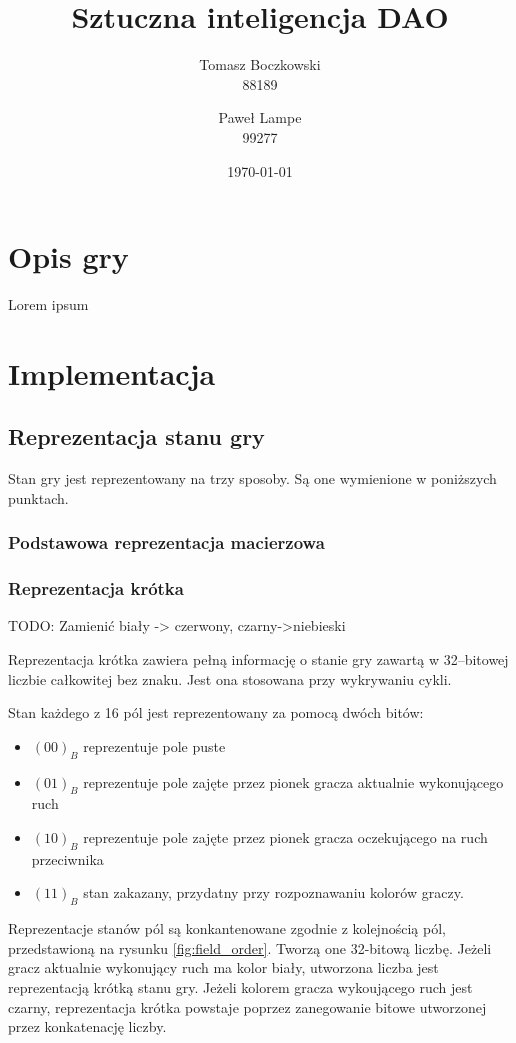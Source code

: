 \documentclass{scrartcl}
\title{Sztuczna inteligencja DAO}
\date{\today}
\author{Tomasz Boczkowski\\ 88189 \and Paweł Lampe\\ 99277}
\begin{document}


\section{Opis gry}

Lorem ipsum

\section{Implementacja}

\subsection{Reprezentacja stanu gry}

Stan gry jest reprezentowany na trzy sposoby. Są one wymienione w
poniższych punktach.

\subsubsection{Podstawowa reprezentacja macierzowa}

\subsubsection{Reprezentacja krótka}

TODO: Zamienić biały -> czerwony, czarny->niebieski

Reprezentacja krótka zawiera pełną informację o stanie gry zawartą
w 32--bitowej liczbie całkowitej bez znaku. Jest ona stosowana przy
wykrywaniu cykli.

Stan każdego z 16 pól jest reprezentowany za pomocą dwóch
bitów:
\begin{itemize}
\item $(00)_B$ reprezentuje pole puste
\item $(01)_B$ reprezentuje pole zajęte przez pionek gracza aktualnie
  wykonującego ruch
\item $(10)_B$ reprezentuje pole zajęte przez pionek gracza
  oczekującego na ruch przeciwnika
\item $(11)_B$ stan zakazany, przydatny przy rozpoznawaniu kolorów
  graczy.
\end{itemize}

Reprezentacje stanów pól są konkantenowane zgodnie z kolejnością pól,
przedstawioną na rysunku \ref{fig:field_order}. Tworzą one 32-bitową
liczbę. Jeżeli gracz aktualnie wykonujący ruch ma kolor biały,
utworzona liczba jest reprezentacją krótką stanu gry. Jeżeli kolorem
gracza wykoującego ruch jest czarny, reprezentacja krótka powstaje 
poprzez zanegowanie bitowe utworzonej przez konkatenację liczby.
\end{document}
